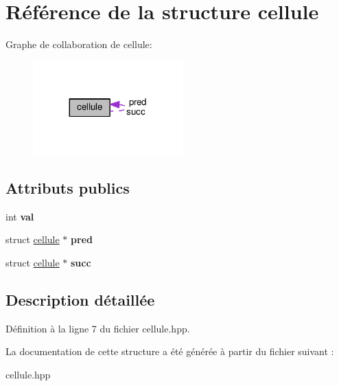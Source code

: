 \hypertarget{structcellule}{\section{Référence de la structure cellule}
\label{structcellule}
}


Graphe de collaboration de cellule\+:\nopagebreak
\begin{figure}[H]
\begin{center}
\leavevmode
\includegraphics[width=164pt]{structcellule__coll__graph}
\end{center}
\end{figure}
\subsection*{Attributs publics}
\begin{DoxyCompactItemize}
\item 
\hypertarget{structcellule_a46ba624e4adf1dbb4dab081f8f2efdd0}{int {\bfseries val}}\label{structcellule_a46ba624e4adf1dbb4dab081f8f2efdd0}

\item 
\hypertarget{structcellule_a5dd827f4ec5d2e8cea82760188a60282}{struct \hyperlink{structcellule}{cellule} $\ast$ {\bfseries pred}}\label{structcellule_a5dd827f4ec5d2e8cea82760188a60282}

\item 
\hypertarget{structcellule_ae9e386b73942def78d49b1fb48475fb4}{struct \hyperlink{structcellule}{cellule} $\ast$ {\bfseries succ}}\label{structcellule_ae9e386b73942def78d49b1fb48475fb4}

\end{DoxyCompactItemize}


\subsection{Description détaillée}


Définition à la ligne 7 du fichier cellule.\+hpp.



La documentation de cette structure a été générée à partir du fichier suivant \+:\begin{DoxyCompactItemize}
\item 
cellule.\+hpp\end{DoxyCompactItemize}
